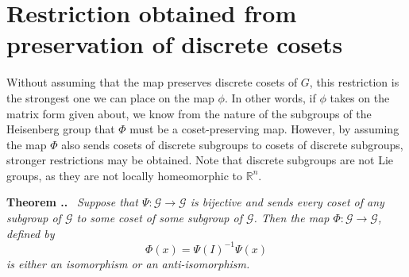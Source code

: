 \documentclass[honours]{UNSWthesis}
\newcommand{\R}{\mathbb{R}}
\newcommand{\G}{\mathcal{G}}
\newcommand{\1}{\mathbf{e}_{1}}
\newcommand{\2}{\mathbf{e}_{3}}
\newcommand{\3}{\mathbf{e}_{3}}
\newcounter{Item}[section]
\newenvironment{Theorem}{\medskip
                            \refstepcounter{Item}
                            \noindent
                           {\bf Theorem \thesection.\theItem.}\ %
                            \begingroup \sl}
                           {\endgroup\medskip}
\begin{document}
\section{Restriction obtained from preservation of discrete cosets}
Without assuming that the map preserves discrete cosets of $G$, this restriction is the strongest one we can place on the map $\phi$. 
In other words, if $\phi$ takes on the matrix form given about, we know from the nature of the subgroups of the Heisenberg group that $\Phi$ must be a coset-preserving map. 
However, by assuming the map $\Phi$ also sends cosets of discrete subgroups to cosets of discrete subgroups, stronger restrictions may be obtained. Note that discrete subgroups are not Lie groups, as they are not locally homeomorphic to $\R^{n}$. 

\begin{Theorem}
Suppose that $\Psi: \G \longrightarrow \G$ is bijective and sends every coset of \emph{any} subgroup of $\G$ to some coset of some subgroup of $\G$. Then the map $\Phi: \G \longrightarrow \G$, defined by 
\[
\Phi(x) = \Psi(I)^{-1}\Psi(x)
\]
is either an isomorphism or an anti-isomorphism. 


\end{Theorem}
\end{document}
